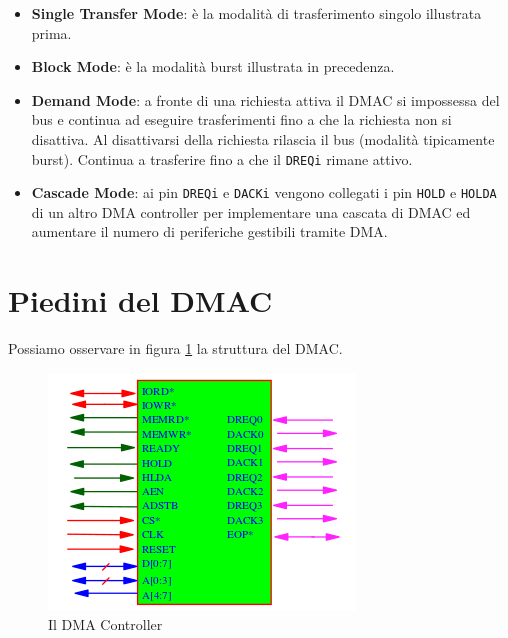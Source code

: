 \documentclass[11pt]{book}
\begin{document}
\begin{itemize}
\item \textbf{Single Transfer Mode}: \`e la modalit\`a di
  trasferimento singolo illustrata prima.

\item \textbf{Block Mode}: \`e la modalit\`a burst illustrata in
  precedenza.

\item \textbf{Demand Mode}: a fronte di una richiesta attiva il DMAC
  si impossessa del bus e continua ad eseguire trasferimenti fino a
  che la richiesta non si disattiva. Al disattivarsi della richiesta
  rilascia il bus (modalit\`a tipicamente burst). Continua a
  trasferire fino a che il \texttt{DREQi} rimane attivo.

\item \textbf{Cascade Mode}: ai pin \texttt{DREQi} e \texttt{DACKi}
  vengono collegati i pin \texttt{HOLD} e \texttt{HOLDA} di un altro
  DMA controller per implementare una cascata di DMAC ed aumentare il
  numero di periferiche gestibili tramite DMA.
\end{itemize}

\section{Piedini del DMAC}

Possiamo osservare in figura \ref{dmac} la struttura del DMAC.

\begin{figure}[h!]
  \centering
  \includegraphics[width=.5\textwidth]{images/dmac.png}
  \caption{Il DMA Controller}
  \label{dmac}
\end{figure}
\end{document}
